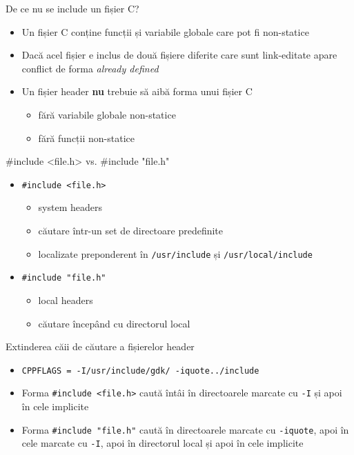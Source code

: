 \documentclass{beamer}
\begin{document}
\begin{frame}{De ce nu se include un fișier C?}
	\begin{itemize}
		\item Un fișier C conține funcții și variabile globale care pot fi non-statice
		\item Dacă acel fișier e inclus de două fișiere diferite care sunt
link-editate apare conflict de forma \textit{already defined}
		\item Un fișier header \textbf{nu} trebuie să aibă forma unui fișier C
			\begin{itemize}
				\item fără variabile globale non-statice
				\item fără funcții non-statice
			\end{itemize}
	\end{itemize}
\end{frame}

\begin{frame}{\#include \textless{}file.h\textgreater{} vs. \#include "file.h"}
	\begin{itemize}
		\item \texttt{\#include \textless{}file.h\textgreater{}}
			\begin{itemize}
				\item system headers
				\item căutare într-un set de directoare predefinite
				\item localizate preponderent în \texttt{/usr/include} și
\texttt{/usr/local/include}
			\end{itemize}
		\item \texttt{\#include "file.h"}
			\begin{itemize}
				\item local headers
				\item căutare începând cu directorul local
			\end{itemize}
	\end{itemize}
\end{frame}

\begin{frame}{Extinderea căii de căutare a fișierelor header}
	\begin{itemize}
		\item \texttt{CPPFLAGS = -I/usr/include/gdk/ -iquote../include}
		\item Forma \texttt{\#include \textless{}file.h\textgreater{}} caută
întâi în directoarele marcate cu \texttt{-I} și apoi în cele implicite
		\item Forma \texttt{\#include "file.h"} caută în directoarele marcate
cu \texttt{-iquote}, apoi în cele marcate cu \texttt{-I}, apoi în directorul
local și apoi în cele implicite
	\end{itemize}
\end{frame}
\end{document}
